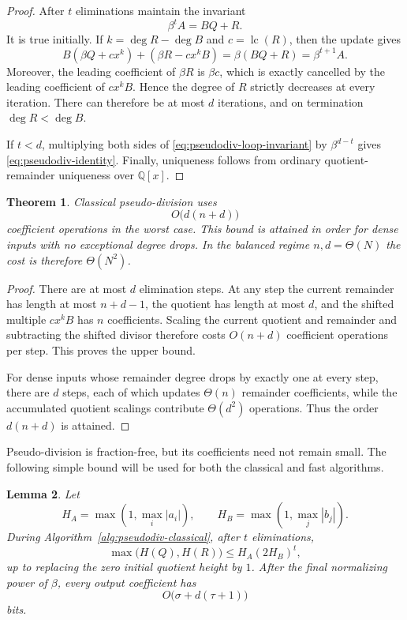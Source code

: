\documentclass[11pt]{book}
\newtheorem{theorem}{Theorem}[section]
\newtheorem{lemma}[theorem]{Lemma}
\theoremstyle{definition}
\begin{document}
\begin{proof}
After $t$ eliminations maintain the invariant
\begin{equation}\label{eq:pseudodiv-loop-invariant}
 \beta^t A=BQ+R.
\end{equation}
It is true initially.  If $k=\deg R-\deg B$ and
$c=\operatorname{lc}(R)$, then the update gives
\[
 B(\beta Q+cx^k)+(\beta R-cx^kB)
 =\beta(BQ+R)=\beta^{t+1}A.
\]
Moreover, the leading coefficient of $\beta R$ is $\beta c$, which is
exactly cancelled by the leading coefficient of $cx^kB$.  Hence the degree
of $R$ strictly decreases at every iteration.  There can therefore be at
most $d$ iterations, and on termination $\deg R<\deg B$.

If $t<d$, multiplying both sides of \eqref{eq:pseudodiv-loop-invariant} by
$\beta^{d-t}$ gives \eqref{eq:pseudodiv-identity}.  Finally, uniqueness
follows from ordinary quotient-remainder uniqueness over $\mathbb Q[x]$.
\end{proof}

\begin{theorem}\label{thm:pseudodiv-classical-complexity}
Classical pseudo-division uses
\[
 O\bigl(d(n+d)\bigr)
\]
coefficient operations in the worst case.  This bound is attained in order
for dense inputs with no exceptional degree drops.  In the balanced regime
$n,d=\Theta(N)$ the cost is therefore $\Theta(N^2)$.
\end{theorem}

\begin{proof}
There are at most $d$ elimination steps.  At any step the current remainder
has length at most $n+d-1$, the quotient has length at most $d$, and the
shifted multiple $cx^kB$ has $n$ coefficients.  Scaling the current quotient
and remainder and subtracting the shifted divisor therefore costs
$O(n+d)$ coefficient operations per step.  This proves the upper bound.

For dense inputs whose remainder degree drops by exactly one at every step,
there are $d$ steps, each of which updates $\Theta(n)$ remainder
coefficients, while the accumulated quotient scalings contribute
$\Theta(d^2)$ operations.  Thus the order $d(n+d)$ is attained.
\end{proof}

Pseudo-division is fraction-free, but its coefficients need not remain small.
The following simple bound will be used for both the classical and fast
algorithms.

\begin{lemma}\label{lem:pseudodiv-coefficient-growth}
Let
\[
 H_A=\max(1,\max_i|a_i|),
 \qquad
 H_B=\max(1,\max_j|b_j|).
\]
During Algorithm~\ref{alg:pseudodiv-classical}, after $t$ eliminations,
\[
 \max\bigl(H(Q),H(R)\bigr)
 \le H_A(2H_B)^t,
\]
up to replacing the zero initial quotient height by $1$.  After the final
normalizing power of $\beta$, every output coefficient has
\begin{equation}\label{eq:pseudodiv-output-bits}
 O\bigl(\sigma+d(\tau+1)\bigr)
\end{equation}
bits.
\end{lemma}
\end{document}
